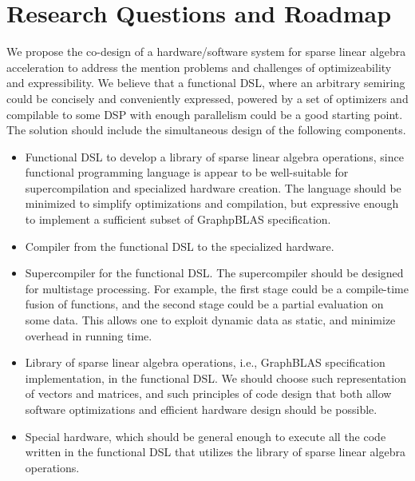 \documentclass[10pt,conference]{IEEEtran}
\begin{document}
\section{Research Questions and Roadmap}
We propose the co-design of a hardware/software system for sparse linear algebra acceleration to address the mention problems and challenges of optimizeability and expressibility.
We believe that a functional DSL, where an arbitrary semiring could be concisely and conveniently expressed, powered by a set of optimizers and compilable to some DSP with enough parallelism could be a good starting point.
The solution should include the simultaneous design of the following components.
\begin{itemize}
  \item Functional DSL to develop a library of sparse linear algebra operations, since 
  functional programming language is appear to be well-suitable for supercompilation and specialized hardware creation.
  The language should be minimized to simplify optimizations and compilation, but expressive enough to implement a sufficient subset of GraphpBLAS specification.
  \item Compiler from the functional DSL to the specialized hardware. 
  \item Supercompiler for the functional DSL. The supercompiler should be designed for multistage processing.
  For example, the first stage could be a compile-time fusion of functions, and the second stage could be a partial evaluation on some data. 
  This allows one to exploit dynamic data as static, and minimize overhead in running time. 
  \item Library of sparse linear algebra operations, i.e., GraphBLAS specification implementation, in the functional DSL.
  We should choose such representation of vectors and matrices, and such principles of code design that both allow software optimizations and efficient hardware design should be possible.  
  \item Special hardware, which should be general enough to execute all the code written in the functional DSL that utilizes the library of sparse linear algebra operations.  
\end{itemize}
\end{document}
